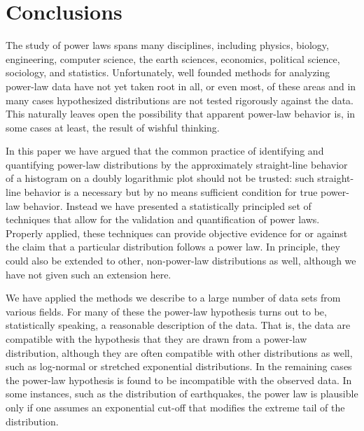 \documentclass[final]{siamltex}
\begin{document}

\section{Conclusions}
The study of power laws spans many disciplines, including physics, biology,
engineering, computer science, the earth sciences, economics, political
science, sociology, and statistics.  Unfortunately, well founded methods
for analyzing power-law data have not yet taken root in all, or even most,
of these areas and in many cases hypothesized distributions are not tested
rigorously against the data.  This naturally leaves open the possibility
that apparent power-law behavior is, in some cases at least, the result of
wishful thinking.

In this paper we have argued that the common practice of identifying and
quantifying power-law distributions by the approximately straight-line
behavior of a histogram on a doubly logarithmic plot should not be trusted:
such straight-line behavior is a necessary but by no means sufficient
condition for true power-law behavior.  Instead we have presented a
statistically principled set of techniques that allow for the validation
and quantification of power laws.  Properly applied, these techniques can
provide objective evidence for or against the claim that a particular
distribution follows a power law.  In principle, they could also be
extended to other, non-power-law distributions as well, although we have
not given such an extension here.

We have applied the methods we describe to a large number of data sets from
various fields.  For many of these the power-law hypothesis turns out to
be, statistically speaking, a reasonable description of the data.  That is,
the data are compatible with the hypothesis that they are drawn from a
power-law distribution, although they are often compatible with other
distributions as well, such as log-normal or stretched exponential
distributions.  In the remaining cases the power-law hypothesis is found to
be incompatible with the observed data.  In some instances, such as the
distribution of earthquakes, the power law is plausible only if one assumes
an exponential cut-off that modifies the extreme tail of the distribution.
\end{document}
